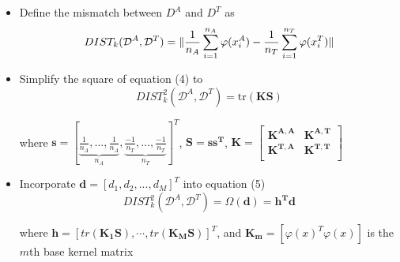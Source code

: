 \begin{frame}
	\begin{itemize}
		\item Define the mismatch between $D^A$ and $D^T$ as 
\begin{equation}
DIST_k(\mathcal{D}^A, \mathcal{D}^T) = \lVert \frac{1}{n_A} \sum_{i=1}^{n_A} \varphi(x_i^A) - \frac{1}{n_T} \sum_{i=1}^{n_T} \varphi (x_i^T) \rVert
\end{equation}

		\item Simplify the square of equation (4) to
\begin{equation}
DIST_k^2(\mathcal{D}^A, \mathcal{D}^T) = \text{tr}(\mathbf{KS})
\end{equation}

where $\mathbf{s} = [\underbrace{\frac{1}{n_A}, ..., \frac{1}{n_A}}_\text{$n_A$}, \underbrace{\frac{-1}{n_T},...,\frac{-1}{n_T}}_\text{$n_T$}] ^T$, $\mathbf{S = s s^T }$, $\mathbf{K = \begin{bmatrix} K^{A,A} & K^{A,T} \\ K^{T, A} & K^{T,T}\\  \end{bmatrix}}$

	\item Incorporate \alert{$\mathbf{d} = [d_1, d_2, ..., d_M]^T$} into equation (5)
\begin{equation}
DIST_k^2(\mathcal{D}^A, \mathcal{D}^T) = \Omega(\mathbf{d}) = \mathbf{h^T d}
\end{equation}

where $\mathbf{h} = [tr(\mathbf{K_1 S}), \cdots, tr(\mathbf{K_MS})]^T$, and $\mathbf{K_m} = [\varphi(x)^T \varphi(x)]$ is the $m$th base kernel matrix 

	\end{itemize}
\end{frame}

